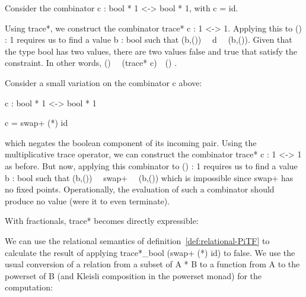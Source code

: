 \documentclass{llncs}
\begin{document}
\begin{example}
Consider the combinator {{c : bool * 1 <-> bool * 1}}, with {{c = id}}.

\noindent Using {{trace*}}, we construct the
combinator {{trace* c : 1 <-> 1}}. Applying this to 
{{() : 1}} requires us to find a value {{b : bool}} such that 
{{(b,()) ~~d~~ (b,())}}. Given that the type {{bool}} 
has two values, there are two values {{false}} and {{true}} that satisfy the 
constraint. In other words, {{() ~~(trace* c)~~() }}.
\end{example}

\begin{example}
\label{ch3:ex:annihilate}
Consider a small variation on the combinator {{c}} above:

{{c : bool * 1 <-> bool * 1}} 

{{c = swap+ (*) id }}

\noindent which negates the boolean component of its incoming
pair. Using the multiplicative trace operator, we can construct the
combinator {{trace* c : 1 <-> 1}} as before. But now, applying this
combinator to {{() : 1}} requires us to find a value {{b : bool}} such
that {{(b,()) ~~swap+~~ (b,())}} which is impossible since {{swap+}} 
has no fixed points.  Operationally, the evaluation of
such a combinator should produce no value (were it to even terminate).
\end{example}

With fractionals, {{trace*}} becomes directly expressible:


We can use the relational semantics of definition~\ref{def:relational-PiTF}
to calculate the result of applying
{{trace*_{bool} (swap+ (*) id)}} to {{false}}.  We use the usual conversion
of a relation from a subset of {{A * B}} to a function from {{A}} to the
powerset of {{B}} (and Kleisli composition in the powerset monad) for
the computation:
\end{document}
